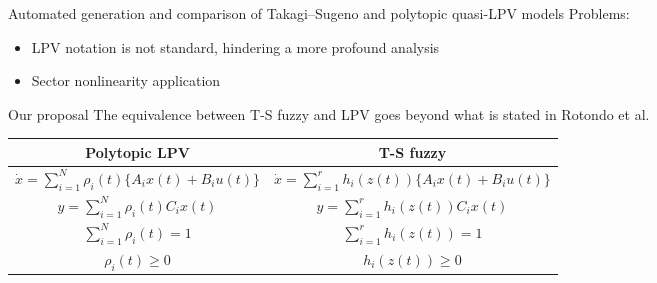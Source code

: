 \begin{frame}{Automated generation and comparison of Takagi–Sugeno and polytopic quasi-LPV models}
Problems:
    \begin{itemize}
        \item LPV notation is not standard, hindering a more profound analysis
        \item Sector nonlinearity application
    \end{itemize}
\end{frame}
\begin{frame}{Our proposal}
    The equivalence between T-S fuzzy and LPV goes beyond what is stated in Rotondo et al.
    \begin{table}[htb]
    \centering
    \begin{tabularx}{\textwidth}{c|c}
         Polytopic LPV& T-S fuzzy  \\ \hline \hline
                $ \dot{x} = \displaystyle  \sum_{i=1}^{N}\rho_i(t)\{A_ix(t)+B_iu(t)\}$ & $\dot{x} = \displaystyle  \sum_{i=1}^{r}h_i(z(t))\{A_ix(t)+B_iu(t)\}$ \\
                $y= \displaystyle \sum_{i=1}^{N}\rho_i(t)C_ix(t)$ &  $ y= \displaystyle  \sum_{i=1}^{r}h_i(z(t))C_ix(t)$ \\
                $\displaystyle\sum_{i=1}^{N}\rho_i(t) = 1$ & $\displaystyle\sum_{i=1}^{r}h_i(z(t)) = 1$ \\
                $\displaystyle\rho_i(t) \geq 0$ & $\displaystyle h_i(z(t)) \geq 0$
     \end{tabularx}
    \label{tab:mycomp}
\end{table}
\end{frame}

